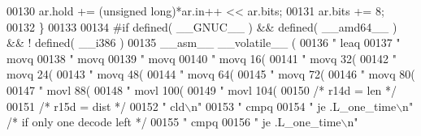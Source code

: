 \begin{DoxyCode}
{{00130         ar.hold += (\textcolor{keywordtype}{unsigned} long)*ar.in++ << ar.bits;
00131         ar.bits += 8;
00132     \}
00133 
00134 \textcolor{preprocessor}{#if defined( \_\_GNUC\_\_ ) && defined( \_\_amd64\_\_ ) && ! defined( \_\_i386 )}
00135     \_\_asm\_\_ \_\_volatile\_\_ (
00136 \textcolor{stringliteral}{"        leaq    %
00137 \textcolor{stringliteral}{"        movq    %
00138 \textcolor{stringliteral}{"        movq    %
00139 \textcolor{stringliteral}{"        movq    %
00140 \textcolor{stringliteral}{"        movq    16(%
00141 \textcolor{stringliteral}{"        movq    32(%
00142 \textcolor{stringliteral}{"        movq    24(%
00143 \textcolor{stringliteral}{"        movq    48(%
00144 \textcolor{stringliteral}{"        movq    64(%
00145 \textcolor{stringliteral}{"        movq    72(%
00146 \textcolor{stringliteral}{"        movq    80(%
00147 \textcolor{stringliteral}{"        movl    88(%
00148 \textcolor{stringliteral}{"        movl    100(%
00149 \textcolor{stringliteral}{"        movl    104(%
00150                                           \textcolor{comment}{/* r14d = len */}
00151                                           \textcolor{comment}{/* r15d = dist */}
00152 \textcolor{stringliteral}{"        cld\(\backslash\)n"}
00153 \textcolor{stringliteral}{"        cmpq    %
00154 \textcolor{stringliteral}{"        je      .L\_one\_time\(\backslash\)n"}           \textcolor{comment}{/* if only one decode left */}
00155 \textcolor{stringliteral}{"        cmpq    %
00156 \textcolor{stringliteral}{"        je      .L\_one\_time\(\backslash\)n"}
}}}}}}}}}}}}}}}}}}
\end{DoxyCode}

